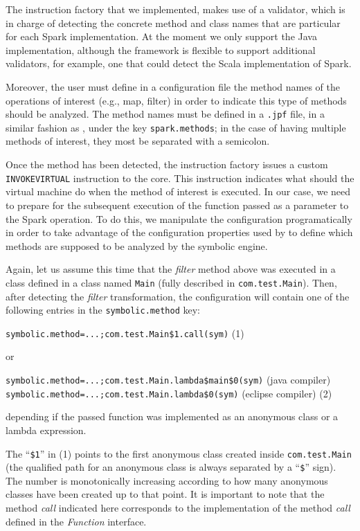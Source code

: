 The instruction factory that we implemented, makes use of a validator, which is in charge of detecting the concrete method and class names that are particular for each Spark implementation. At the moment we only support the Java implementation, although the framework is flexible to support additional validators, for example, one that could detect the Scala implementation of Spark.

Moreover, the user must define in a configuration file the method names of the operations of interest (e.g., map, filter) in order to indicate this type of methods should be analyzed. The method names must be defined in a \texttt{.jpf} file, in a similar fashion as \spf{}, under the key \texttt{spark.methods}; in the case of having multiple methods of interest, they most be separated with a semicolon.

Once the method has been detected, the instruction factory issues a custom \texttt{INVOKEVIRTUAL} instruction to the \jpf{} core. This instruction indicates what should the \jpf{} virtual machine do when the method of interest is executed. In our case, we need to prepare for the subsequent execution of the function passed as a parameter to the Spark operation. To do this, we manipulate the \jpf{} configuration programatically in order to take advantage of the configuration properties used by \spf{} to define which methods are supposed to be analyzed by the symbolic engine.

Again, let us assume this time that the \textit{filter} method above was executed in a class defined in a class named \texttt{Main} (fully described in \texttt{com.test.Main}). Then, after detecting the \textit{filter} transformation, the configuration will contain one of the following entries in the \texttt{symbolic.method} key:

\hspace*{1cm} \lstinline[]|symbolic.method=...;com.test.Main$1.call(sym)|  \hfill (1)

or

\hspace*{1cm} \lstinline[]|symbolic.method=...;com.test.Main.lambda$main$0(sym)| (java compiler) \\
\hspace*{1cm} \lstinline[]|symbolic.method=...;com.test.Main.lambda$0(sym)| (eclipse compiler) \hfill (2)

depending if the passed function was implemented as an anonymous class or a lambda expression. 

The ``\texttt{\$1}'' in (1) points to the first anonymous class created inside \texttt{com.test.Main} (the qualified path for an anonymous class is always separated by a ``\texttt{\$}'' sign). The number is monotonically increasing according to how many anonymous classes have been created up to that point. It is important to note that the method \textit{call} indicated here corresponds to the implementation of the method \textit{call} defined in the \textit{Function} interface.

